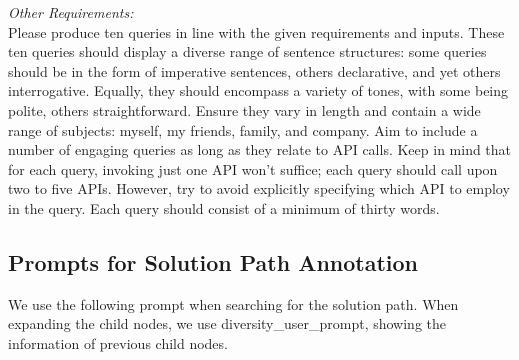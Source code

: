 \noindent\makebox[\linewidth]{\rule{\linewidth}{0.4pt}}
\textit{Other Requirements:}\\
Please produce ten queries in line with the given requirements and inputs. These ten queries should display a diverse range of sentence structures: some queries should be in the form of imperative sentences, others declarative, and yet others interrogative. Equally, they should encompass a variety of tones, with some being polite, others straightforward. Ensure they vary in length and contain a wide range of subjects: myself, my friends, family, and company. Aim to include a number of engaging queries as long as they relate to API calls. Keep in mind that for each query, invoking just one API won't suffice; each query should call upon two to five APIs. However, try to avoid explicitly specifying which API to employ in the query. Each query should consist of a minimum of thirty words.
\noindent\makebox[\linewidth]{\rule{\linewidth}{0.4pt}}


\subsection{Prompts for Solution Path Annotation}
\label{sec:answer_prompt}
We use the following prompt when searching for the solution path. When expanding the child nodes, we use diversity\_user\_prompt, showing the information of previous child nodes.

